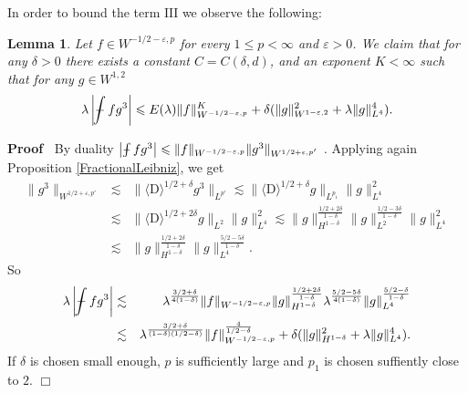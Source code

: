 \documentclass[11pt, oneside]{article}   	%
\newcommand{\Iota}{\mathrm{I}}
\newcommand{\mathD}{\mathrm{D}}
\newenvironment{proof}{\noindent\textbf{Proof\ }}{\hspace*{\fill}$\Box$\medskip}
\newtheorem{lemma}{Lemma}
\def\Xint#1{\mathchoice
{\XXint\displaystyle\textstyle{#1}}%
{\XXint\textstyle\scriptstyle{#1}}%
{\XXint\scriptstyle\scriptscriptstyle{#1}}%
{\XXint\scriptscriptstyle\scriptscriptstyle{#1}}%
\!\int}
\def\XXint#1#2#3{{\setbox0=\hbox{$#1{#2#3}{\int}$ }
\vcenter{\hbox{$#2#3$ }}\kern-.6\wd0}}
\def\dashint{\Xint-}
\newcommand{\bint}{\dashint}
\begin{document}
In order to bound the term $\Iota \Iota \Iota$ we observe the following:

\begin{lemma}
  \label{lemma:bound-cubic}Let $f \in W^{- 1 / 2 - \varepsilon, p}$ for every
  $1 \leqslant p < \infty$ and $\varepsilon > 0$. We claim that for any
  $\delta > 0$ there exists a constant $C = C (\delta, d)$, and an exponent $K
  < \infty$ such that for any $g \in W^{1, 2}$
  \[ \lambda \left| \bint f g^3 \right| \leqslant E (\lambda) \| f \|^K_{W^{-
     1 / 2 - \varepsilon, p} } + \delta (\| g \|^2_{W^{1 - \varepsilon, 2}} +
     \lambda \| g \|^4_{L^4 }) . \]
\end{lemma}

\begin{proof}
  By duality $\left| \bint f g^3 \right| \leqslant \| f \|_{W^{- 1 / 2 -
  \varepsilon, p}} \| g^3 \|_{W^{1 / 2 + \varepsilon, p'}}$ . Applying again
  Proposition \ref{FractionalLeibniz}, we get
  \begin{eqnarray*}
    \| g^3 \|_{W^{1 / 2 + \varepsilon, p'}} & \lesssim & \| \langle \mathD
    \rangle^{1 / 2 + \delta} g^3 \|_{L^{p'}} \lesssim \| \langle \mathD
    \rangle^{1 / 2 + \delta} g\|_{L^{p_1}} \| g \|_{L^4}^2\\
    & \lesssim & \| \langle \mathD \rangle^{1 / 2 + 2 \delta} g\|_{L^2
    } \| g \|_{L^4}^2 \lesssim \|g\|^{\frac{1 / 2 + 2 \delta}{1 -
    \delta}}_{H^{1 - \delta}} \| g \|_{L^2}^{\frac{1 / 2 - 3 \delta}{1 -
    \delta}} \| g \|_{L^4}^2\\
    & \lesssim & \|g\|^{\frac{1 / 2 + 2 \delta}{1 - \delta}}_{H^{1 -
    \delta}} \| g \|_{L^4}^{\frac{5 / 2 - 5 \delta}{1 - \delta}} .
  \end{eqnarray*}
  So
  \begin{eqnarray*}
    \lambda \left| \bint f g^3 \right| & \lesssim & \lambda^{\frac{3 / 2 +
    \delta}{4 (1 - \delta)}} \| f \|_{W^{- 1 / 2 - \varepsilon, p}}
    \|g\|^{\frac{1 / 2 + 2 \delta}{1 - \delta}}_{H^{1 - \delta}}
    \lambda^{\frac{5 / 2 - 5 \delta}{4 (1 - \delta)}} \| g
    \|_{L^4}^{\frac{5 / 2 - \delta}{1 - \delta}}\\
    & \lesssim & \lambda^{\frac{3 / 2 + \delta}{(1 - \delta) (1 / 2 -
    \delta)}} \| f \|^{\frac{4}{1 / 2 - \delta}}_{W^{- 1 / 2 - \varepsilon,
    p}} + \delta (\|g\|^2_{H^{1 - \delta}} + \lambda \| g \|_{L^4}^4) .
  \end{eqnarray*}
  If $\delta$ is chosen small enough, $p$ is sufficiently large and $p_1$ is
  chosen suffiently close to $2$.
\end{proof}
\end{document}
